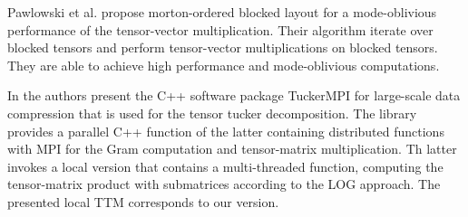 Pawlowski et al. \cite{pawlowski:2019:morton.tensor.computations} propose morton-ordered blocked layout for a mode-oblivious performance of the tensor-vector multiplication.
Their algorithm iterate over blocked tensors and perform tensor-vector multiplications on blocked tensors.
They are able to achieve high performance and mode-oblivious computations.


In \cite{ballard:2020:tuckermpi} the authors present the C++ software package TuckerMPI for large-scale data compression that is used for the tensor tucker decomposition.
The library provides a parallel C++ function of the latter containing distributed functions with MPI for the Gram computation and tensor-matrix multiplication.
Th latter invokes a local version that contains a multi-threaded  function, computing the tensor-matrix product with submatrices according to the LOG approach.
The presented local TTM corresponds to our  version.
\begin{comment}
 which is used 
The local version is used in the global version of the TTM.
* the parallel/global version distributes the tensor in blockwise fashion (algorithm 2) 
* the product sizes in TuckerMPI (sec. 2.1) are called strides in our TTM paper (sec 3.4).
* the index to linear and its inverse transformation idx2lin/lin2indx transformation is genearlized in our TTM paper (sec.3.4)
* algorithm 3 (sec. 5.3) corresponds to function `<par-gemm,subtensor>` version in our TTM paper (sec 4.4.1)
\end{comment}


